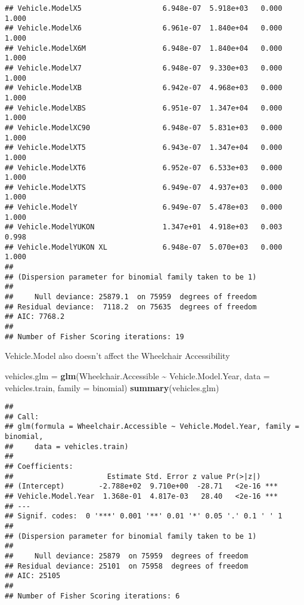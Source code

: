 \documentclass[
]{article}
\newenvironment{Shaded}{\begin{snugshade}}{\end{snugshade}}
\newcommand{\AttributeTok}[1]{\textcolor[rgb]{0.13,0.29,0.53}{#1}}
\newcommand{\FunctionTok}[1]{\textcolor[rgb]{0.13,0.29,0.53}{\textbf{#1}}}
\newcommand{\NormalTok}[1]{#1}
\newcommand{\OtherTok}[1]{\textcolor[rgb]{0.56,0.35,0.01}{#1}}
\newcommand{\SpecialCharTok}[1]{\textcolor[rgb]{0.81,0.36,0.00}{\textbf{#1}}}
\begin{document}
\begin{verbatim}
## Vehicle.ModelX5                   6.948e-07  5.918e+03   0.000    1.000
## Vehicle.ModelX6                   6.961e-07  1.840e+04   0.000    1.000
## Vehicle.ModelX6M                  6.948e-07  1.840e+04   0.000    1.000
## Vehicle.ModelX7                   6.948e-07  9.330e+03   0.000    1.000
## Vehicle.ModelXB                   6.942e-07  4.968e+03   0.000    1.000
## Vehicle.ModelXBS                  6.951e-07  1.347e+04   0.000    1.000
## Vehicle.ModelXC90                 6.948e-07  5.831e+03   0.000    1.000
## Vehicle.ModelXT5                  6.943e-07  1.347e+04   0.000    1.000
## Vehicle.ModelXT6                  6.952e-07  6.533e+03   0.000    1.000
## Vehicle.ModelXTS                  6.949e-07  4.937e+03   0.000    1.000
## Vehicle.ModelY                    6.949e-07  5.478e+03   0.000    1.000
## Vehicle.ModelYUKON                1.347e+01  4.918e+03   0.003    0.998
## Vehicle.ModelYUKON XL             6.948e-07  5.070e+03   0.000    1.000
## 
## (Dispersion parameter for binomial family taken to be 1)
## 
##     Null deviance: 25879.1  on 75959  degrees of freedom
## Residual deviance:  7118.2  on 75635  degrees of freedom
## AIC: 7768.2
## 
## Number of Fisher Scoring iterations: 19
\end{verbatim}

Vehicle.Model also doesn't affect the Wheelchair Accessibility

\begin{Shaded}
\begin{Highlighting}[]
\NormalTok{vehicles.glm }\OtherTok{=} \FunctionTok{glm}\NormalTok{(Wheelchair.Accessible }\SpecialCharTok{\textasciitilde{}}\NormalTok{ Vehicle.Model.Year, }\AttributeTok{data =}\NormalTok{ vehicles.train, }
                   \AttributeTok{family =}\NormalTok{ binomial)}
\FunctionTok{summary}\NormalTok{(vehicles.glm)}
\end{Highlighting}
\end{Shaded}

\begin{verbatim}
## 
## Call:
## glm(formula = Wheelchair.Accessible ~ Vehicle.Model.Year, family = binomial, 
##     data = vehicles.train)
## 
## Coefficients:
##                      Estimate Std. Error z value Pr(>|z|)    
## (Intercept)        -2.788e+02  9.710e+00  -28.71   <2e-16 ***
## Vehicle.Model.Year  1.368e-01  4.817e-03   28.40   <2e-16 ***
## ---
## Signif. codes:  0 '***' 0.001 '**' 0.01 '*' 0.05 '.' 0.1 ' ' 1
## 
## (Dispersion parameter for binomial family taken to be 1)
## 
##     Null deviance: 25879  on 75959  degrees of freedom
## Residual deviance: 25101  on 75958  degrees of freedom
## AIC: 25105
## 
## Number of Fisher Scoring iterations: 6
\end{verbatim}
\end{document}
